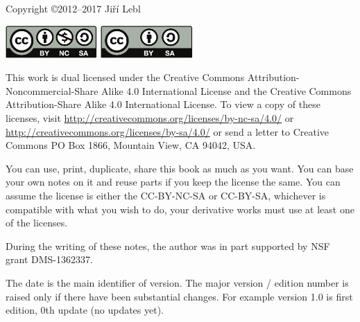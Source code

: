 \documentclass[12pt]{book}
\theoremstyle{plain}
\theoremstyle{remark}
\theoremstyle{definition}
\theoremstyle{exercise}
\theoremstyle{example}
\begin{document}
\noindent
Copyright \copyright 2012--2017 Ji{\v r}\'i Lebl

\bigskip

\noindent
\includegraphics[width=1.38in]{figures/license}
\quad
\includegraphics[width=1.38in]{figures/license2}

\bigskip

\noindent
This work is dual licensed under
the Creative Commons
Attribution-Non\-commercial-Share Alike 4.0 International License and
the Creative Commons
Attribution-Share Alike 4.0 International License.
To view a
copy of these licenses, visit
\url{http://creativecommons.org/licenses/by-nc-sa/4.0/}
or
\url{http://creativecommons.org/licenses/by-sa/4.0/}
or send a letter to
Creative Commons
PO Box 1866, Mountain View, CA 94042, USA.

\bigskip

\noindent
You can use, print, duplicate, share this book as much as you want.  You can
base your own notes on it and reuse parts if you keep the license the
same.  You can assume the license is either the CC-BY-NC-SA or CC-BY-SA,
whichever is compatible with what you wish to do, your derivative works must
use at least one of the licenses.

\bigskip

\noindent
During the writing of these notes, 
the author was in part supported by NSF grant DMS-1362337.

\bigskip

\noindent
The date is the main identifier of version.  The major version / edition
number is raised only if there have been substantial changes.  For example
version 1.0 is first edition, 0th update (no updates yet).
\end{document}
